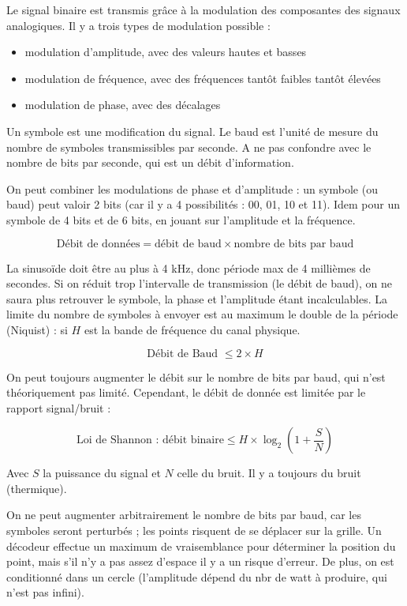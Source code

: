 Le signal binaire est transmis grâce à la modulation des composantes des signaux analogiques. Il y a trois types de modulation possible :

\begin{itemize}
	\item modulation d'amplitude, avec des valeurs hautes et basses
	\item modulation de fréquence, avec des fréquences tantôt faibles tantôt élevées
	\item modulation de phase, avec des décalages
\end{itemize}


Un symbole est une modification du signal. Le baud est l'unité de mesure du nombre de symboles transmissibles par seconde. A ne pas confondre avec le nombre de bits par seconde, qui est un débit d'information.
	
On peut combiner les modulations de phase et d'amplitude : un symbole (ou baud) peut valoir 2 bits (car il y a 4 possibilités : 00, 01, 10 et 11). Idem pour un symbole de 4 bits et de 6 bits, en jouant sur l'amplitude et la fréquence.


$$\text{Débit de données} = \text{débit de baud} \times \text{nombre de bits par baud}$$

La sinusoïde doit être au plus à 4 kHz, donc période max de 4 millièmes de secondes. Si on réduit trop l'intervalle de transmission (le débit de baud), on ne saura plus retrouver le symbole, la phase et l'amplitude étant incalculables. La limite du nombre de symboles à envoyer est au maximum le double de la période (Niquist) : si $H$ est la bande de fréquence du canal physique.

$$\text{Débit de Baud } \leq 2 \times H$$

On peut toujours augmenter le débit sur le nombre de bits par baud, qui n'est théoriquement pas limité. Cependant, le débit de donnée est limitée par le rapport signal/bruit :

$$\text{Loi de Shannon : débit binaire} \leq H \times \log_2(1 + \frac{S}{N})$$

Avec $S$ la puissance du signal et $N$ celle du bruit. Il y a toujours du bruit (thermique).

On ne peut augmenter arbitrairement le nombre de bits par baud, car les symboles seront perturbés ; les points risquent de se déplacer sur la grille. Un décodeur effectue un maximum de vraisemblance pour déterminer la position du point, mais s'il n'y a pas assez d'espace il y a un risque d'erreur.  De plus, on est conditionné dans un cercle (l'amplitude dépend du nbr de watt à produire, qui n'est pas infini).

